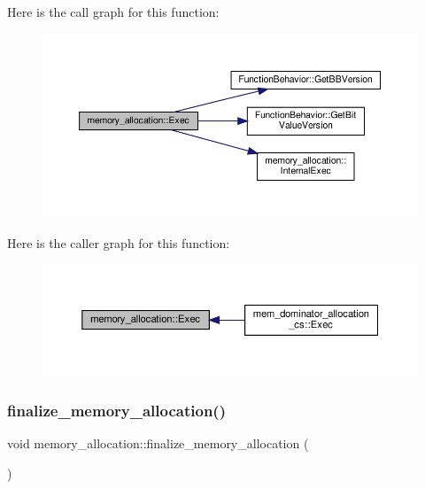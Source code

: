 Here is the call graph for this function\+:
\nopagebreak
\begin{figure}[H]
\begin{center}
\leavevmode
\includegraphics[width=350pt]{db/d9f/classmemory__allocation_a2e53598d28bd9c5f3bc153b15a88759b_cgraph}
\end{center}
\end{figure}
Here is the caller graph for this function\+:
\nopagebreak
\begin{figure}[H]
\begin{center}
\leavevmode
\includegraphics[width=350pt]{db/d9f/classmemory__allocation_a2e53598d28bd9c5f3bc153b15a88759b_icgraph}
\end{center}
\end{figure}
\mbox{\label{classmemory__allocation_aef8d4eaba4caed7aaf19384e67efa6f5}} 
\subsubsection{\texorpdfstring{finalize\+\_\+memory\+\_\+allocation()}{finalize\_memory\_allocation()}}
{\footnotesize\ttfamily void memory\+\_\+allocation\+::finalize\+\_\+memory\+\_\+allocation (\begin{DoxyParamCaption}{ }\end{DoxyParamCaption})\hspace{0.3cm}{\ttfamily [protected]}}



